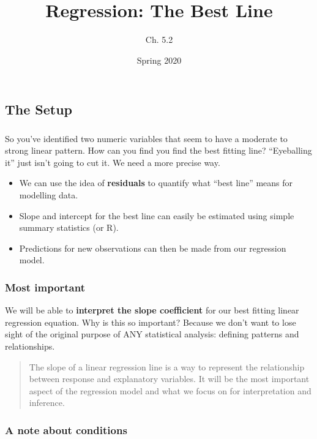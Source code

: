\documentclass[]{article}
\title{Regression: The Best Line}
\subtitle{Ch. 5.2}
\author{}
\date{Spring 2020}
\begin{document}
\maketitle

\hypertarget{the-setup}{%
\subsection{The Setup}\label{the-setup}}

\hypertarget{section}{%
\subsubsection{\texorpdfstring{\href{}{}}{}}\label{section}}

So you've identified two numeric variables that seem to have a moderate
to strong linear pattern. How can you find you find the best fitting
line? ``Eyeballing it'' just isn't going to cut it. We need a more
precise way.

\begin{itemize}
\item
  We can use the idea of \textbf{residuals} to quantify what ``best
  line'' means for modelling data.
\item
  Slope and intercept for the best line can easily be estimated using
  simple summary statistics (or R).
\item
  Predictions for new observations can then be made from our regression
  model.
\end{itemize}

\hypertarget{most-important}{%
\subsubsection{Most important}\label{most-important}}

We will be able to \textbf{interpret the slope coefficient} for our best
fitting linear regression equation. Why is this so important? Because we
don't want to lose sight of the original purpose of ANY statistical
analysis: defining patterns and relationships.

\begin{quote}
The slope of a linear regression line is a way to represent the
relationship between response and explanatory variables. It will be the
most important aspect of the regression model and what we focus on for
interpretation and inference.
\end{quote}

\hypertarget{a-note-about-conditions}{%
\subsubsection{A note about conditions}\label{a-note-about-conditions}}
\end{document}
